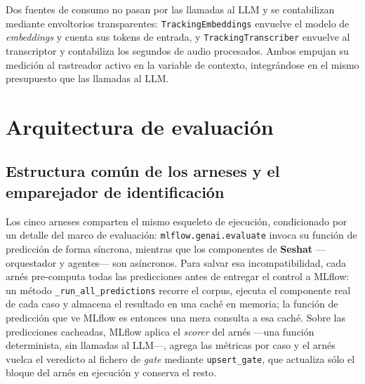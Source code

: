 Dos fuentes de consumo no pasan por las llamadas al LLM y se contabilizan mediante envoltorios
transparentes: \texttt{TrackingEmbeddings} envuelve el modelo de \textit{embeddings} y cuenta sus
tokens de entrada, y \texttt{TrackingTranscriber} envuelve al transcriptor y contabiliza los
segundos de audio procesados. Ambos empujan su medición al rastreador activo en la variable de
contexto, integrándose en el mismo presupuesto que las llamadas al LLM.

\section{Arquitectura de evaluación}

\subsection{Estructura común de los arneses y el emparejador de identificación}
\label{anx:harnesses-eval}

Los cinco arneses comparten el mismo esqueleto de ejecución, condicionado por un detalle del marco
de evaluación: \texttt{mlflow.genai.evaluate} invoca su función de predicción de forma síncrona,
mientras que los componentes de \textbf{Seshat} —orquestador y agentes— son asíncronos. Para
salvar esa incompatibilidad, cada arnés pre-computa todas las predicciones antes de entregar el
control a MLflow: un método \texttt{\_run\_all\_predictions} recorre el corpus, ejecuta el
componente real de cada caso y almacena el resultado en una caché en memoria; la función de
predicción que ve MLflow es entonces una mera consulta a esa caché. Sobre las predicciones
cacheadas, MLflow aplica el \textit{scorer} del arnés —una función determinista, sin llamadas al
LLM—, agrega las métricas por caso y el arnés vuelca el veredicto al fichero de \textit{gate}
mediante \texttt{upsert\_gate}, que actualiza sólo el bloque del arnés en ejecución y conserva el
resto.

